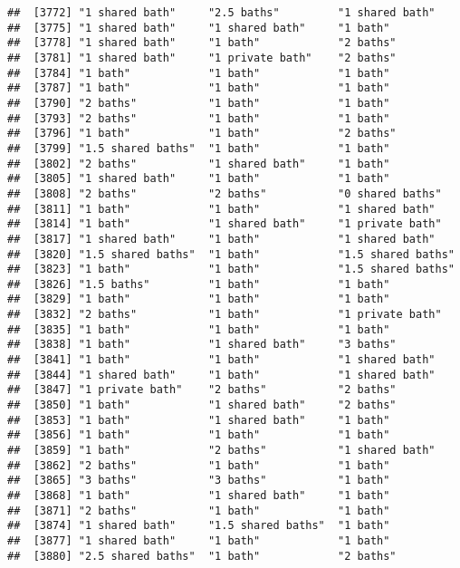 \documentclass[
]{article}
\begin{document}
\begin{verbatim}
##  [3772] "1 shared bath"     "2.5 baths"         "1 shared bath"    
##  [3775] "1 shared bath"     "1 shared bath"     "1 bath"           
##  [3778] "1 shared bath"     "1 bath"            "2 baths"          
##  [3781] "1 shared bath"     "1 private bath"    "2 baths"          
##  [3784] "1 bath"            "1 bath"            "1 bath"           
##  [3787] "1 bath"            "1 bath"            "1 bath"           
##  [3790] "2 baths"           "1 bath"            "1 bath"           
##  [3793] "2 baths"           "1 bath"            "1 bath"           
##  [3796] "1 bath"            "1 bath"            "2 baths"          
##  [3799] "1.5 shared baths"  "1 bath"            "1 bath"           
##  [3802] "2 baths"           "1 shared bath"     "1 bath"           
##  [3805] "1 shared bath"     "1 bath"            "1 bath"           
##  [3808] "2 baths"           "2 baths"           "0 shared baths"   
##  [3811] "1 bath"            "1 bath"            "1 shared bath"    
##  [3814] "1 bath"            "1 shared bath"     "1 private bath"   
##  [3817] "1 shared bath"     "1 bath"            "1 shared bath"    
##  [3820] "1.5 shared baths"  "1 bath"            "1.5 shared baths" 
##  [3823] "1 bath"            "1 bath"            "1.5 shared baths" 
##  [3826] "1.5 baths"         "1 bath"            "1 bath"           
##  [3829] "1 bath"            "1 bath"            "1 bath"           
##  [3832] "2 baths"           "1 bath"            "1 private bath"   
##  [3835] "1 bath"            "1 bath"            "1 bath"           
##  [3838] "1 bath"            "1 shared bath"     "3 baths"          
##  [3841] "1 bath"            "1 bath"            "1 shared bath"    
##  [3844] "1 shared bath"     "1 bath"            "1 shared bath"    
##  [3847] "1 private bath"    "2 baths"           "2 baths"          
##  [3850] "1 bath"            "1 shared bath"     "2 baths"          
##  [3853] "1 bath"            "1 shared bath"     "1 bath"           
##  [3856] "1 bath"            "1 bath"            "1 bath"           
##  [3859] "1 bath"            "2 baths"           "1 shared bath"    
##  [3862] "2 baths"           "1 bath"            "1 bath"           
##  [3865] "3 baths"           "3 baths"           "1 bath"           
##  [3868] "1 bath"            "1 shared bath"     "1 bath"           
##  [3871] "2 baths"           "1 bath"            "1 bath"           
##  [3874] "1 shared bath"     "1.5 shared baths"  "1 bath"           
##  [3877] "1 shared bath"     "1 bath"            "1 bath"           
##  [3880] "2.5 shared baths"  "1 bath"            "2 baths"          

\end{verbatim}
\end{document}
